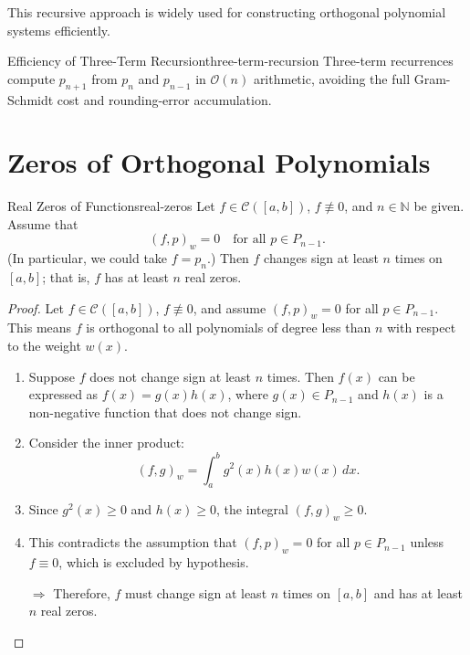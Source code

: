 This recursive approach is widely used for constructing orthogonal polynomial systems efficiently.

\begin{remark}{Efficiency of Three-Term Recursion}{three-term-recursion}
Three-term recurrences compute $p_{n+1}$ from $p_n$ and $p_{n-1}$ in $\mathcal{O}(n)$ arithmetic, avoiding the full Gram-Schmidt cost and rounding-error accumulation.
\end{remark}

\section{Zeros of Orthogonal Polynomials}
\label{sec:zeros}

\begin{theorem}{Real Zeros of Functions}{real-zeros}
    Let $f \in \mathcal{C}([a,b])$, $f \not\equiv 0$, and $n \in \mathbb{N}$ be given. Assume that
    \[
        (f, p)_w = 0 \quad \text{for all } p \in P_{n-1}.
    \]
    (In particular, we could take $f = p_n$.) Then $f$ changes sign at least $n$ times on $[a,b]$; that is, $f$ has at least $n$ real zeros.
\end{theorem}

\begin{proof}
    Let $f \in \mathcal{C}([a,b])$, $f \not\equiv 0$, and assume $(f, p)_w = 0$ for all $p \in P_{n-1}$.
    This means $f$ is orthogonal to all polynomials of degree less than $n$ with respect to the weight $w(x)$.

    \begin{enumerate}
        \item Suppose $f$ does not change sign at least $n$ times. Then $f(x)$ can be expressed as $f(x) = g(x) h(x)$, where $g(x) \in P_{n-1}$ and $h(x)$ is a non-negative function that does not change sign.
        \item Consider the inner product:
              \[
                  (f, g)_w = \int_a^b g^2(x) h(x) w(x)\,dx.
              \]
        \item Since $g^2(x) \geq 0$ and $h(x) \geq 0$, the integral $(f, g)_w \geq 0$.
        \item This contradicts the assumption that $(f, p)_w = 0$ for all $p \in P_{n-1}$ unless $f \equiv 0$, which is excluded by hypothesis.
        \item[$\Rightarrow$] Therefore, $f$ must change sign at least $n$ times on $[a,b]$ and has at least $n$ real zeros.
    \end{enumerate}
\end{proof}


